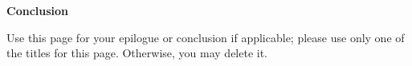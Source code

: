 
\begin{center}
\pagebreak
\vspace*{5\baselineskip}
\textbf{\large Conclusion }
\end{center}


\begin{flushleft}
\hspace{10mm}Use this page for your epilogue or conclusion if applicable; please use only one of the titles for this page. Otherwise, you may delete it.
\end{flushleft}




